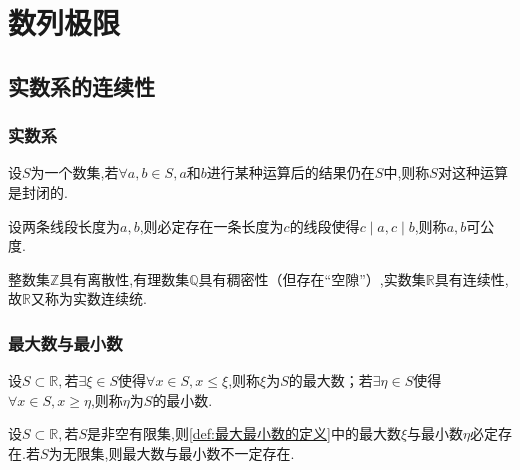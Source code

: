 \newpage
\chapter{数列极限}
\section{实数系的连续性}
\subsection{实数系}
\begin{formal}
    \begin{definition}[数集的封闭性的定义]\label{def:数集的封闭性的定义}
        设$S$为一个数集,若$\forall a,b\in S,a$和$b$进行某种运算后的结果仍在$S$中,则称$S$对这种运算是封闭的.
    \end{definition}
\end{formal}
\begin{formal}
    \begin{definition}[可公度的定义]\label{def:可公度的定义}
        设两条线段长度为$a,b$,则必定存在一条长度为$c$的线段使得$c\mid a,c\mid b$,则称$a,b$可公度.
    \end{definition}
\end{formal}
\begin{red}
\begin{remark}
    整数集$\mathbb{Z}$具有离散性,有理数集$\mathbb{Q}$具有稠密性（但存在“空隙”）,实数集$\mathbb{R}$具有连续性,故$\mathbb{R}$又称为实数连续统.
\end{remark}
\end{red}
\subsection{最大数与最小数}
\begin{formal}
    \begin{definition}[最大最小数的定义]\label{def:最大最小数的定义}
        设$S\subset\mathbb{R},$若$\exists\xi\in S$使得$\forall x\in S,x\leqslant\xi$,则称$\xi$为$S$的最大数；若$\exists\eta\in S$使得$\forall x\in S,x\geqslant\eta$,则称$\eta$为$S$的最小数.
    \end{definition}
\end{formal}
\begin{formal}
    \begin{theorem}[最大最小数的存在性]\label{thm:最大最小数的存在性}
        设$S\subset\mathbb{R},$若$S$是非空有限集,则\cref{def:最大最小数的定义}中的最大数$\xi$与最小数$\eta$必定存在.若$S$为无限集,则最大数与最小数不一定存在.
    \end{theorem}
\end{formal}
